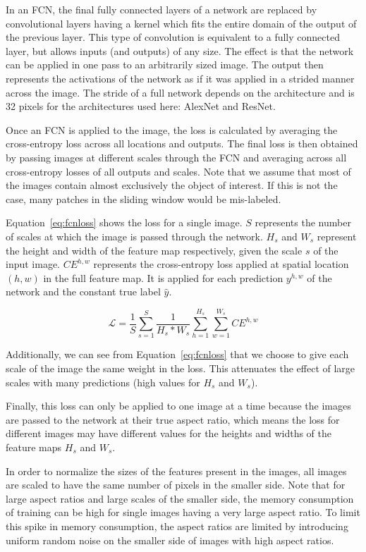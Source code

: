In an FCN, the final fully connected layers
of a network are replaced by convolutional layers having a kernel
which fits the entire domain of the output of the previous layer.
This type of convolution is equivalent to a fully connected layer,
but allows inputs (and outputs) of any size.
The effect is that the network can be applied in one pass to an
arbitrarily sized image. The output then represents the activations
of the network as if it was applied in a strided manner across the image.
The stride of a full network depends on the architecture and is 32
pixels for the architectures used here: AlexNet and ResNet.

Once an FCN is applied to the image, the loss
is calculated by averaging the cross-entropy loss across all locations
and outputs.
The final loss is then obtained by passing images at different scales
through the FCN and averaging across all cross-entropy losses of all
outputs and scales. Note that we assume that most of the images contain
almost exclusively the object of interest. If this is not the case, many
patches in the sliding window would be mis-labeled.

Equation~\ref{eq:fcnloss} shows the loss for a
single image. $S$ represents the number of scales at which the image
is passed through the network.
$H_s$ and $W_s$ represent the height and width of the feature
map respectively, given the scale $s$ of the input image.
$\mathit{CE}^{h,w}$ represents the cross-entropy loss applied
at spatial location $(h,w)$ in the full feature map. It is applied
for each prediction $y^{h,w}$ of the network and the constant true label
$\hat{y}$.

\begin{equation}\label{eq:fcnloss}
\mathcal{L} = \frac{1}{S} \sum_{s=1}^S \frac{1}{H_s*W_s}
\sum_{h=1}^{H_s} \sum_{w=1}^{W_s} \mathit{CE}^{h,w}
\end{equation}

Additionally, we can see from Equation~\ref{eq:fcnloss} that we choose
to give each scale of the image the same weight in the loss. This
attenuates the effect of large scales with many predictions (high
values for $H_s$ and $W_s$).

Finally, this loss can only be applied to one image at a time because
the images are passed to the network at their true
aspect ratio, which means the loss for different images may have different
values for the heights and widths of the feature maps $H_s$ and $W_s$.

In order to normalize the sizes of the features present in the images,
all images are scaled to have the same
number of pixels in the smaller side. Note that for large aspect
ratios and large scales of the smaller side,
the memory consumption of training can be high for single images
having a very large aspect ratio. To limit this spike in memory
consumption, the aspect ratios are limited by introducing uniform
random noise on the smaller side of images with high aspect ratios.

